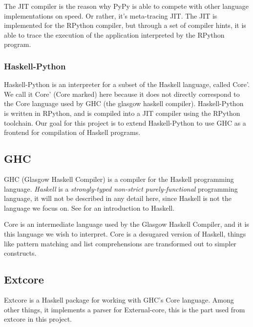 The JIT compiler is the reason why PyPy is able to compete with other language implementations
on speed. Or rather, it's meta-tracing JIT. The JIT is implemented
for the RPython compiler, but through a set of compiler hints, it is able to trace the 
execution of the application interpreted by the RPython program.

\subsubsection{Haskell-Python}

Haskell-Python is an interpreter for a subset of the Haskell language, called Core'.
We call it Core' (Core marked) here because it does not directly correspond to 
the Core language
used by GHC (the glasgow haskell compiler). Haskell-Python is written in RPython,
and is compiled into a JIT compiler using the RPython toolchain. Our goal for this
project is to extend Haskell-Python to use GHC as a frontend for compilation 
of Haskell programs.

\subsection{GHC}

GHC (Glasgow Haskell Compiler) is a compiler for the Haskell programming language.
\emph{Haskell} is a \emph{strongly-typed non-strict purely-functional} 
programming language, it will not be described in any detail here, since 
Haskell is not the language we focus on. See \cite{hudak1992report}
for an introduction to Haskell. 

Core is an intermediate language used by the Glasgow Haskell Compiler\cite{ghc},
and it is this language we wish to interpret. Core is a desugared version of Haskell, 
things like pattern matching
and list comprehensions are transformed out to simpler constructs.\cite{jones1994compilation}

\subsection{Extcore}

Extcore is a Haskell package for working with GHC's Core language. Among other things,
it implements a parser for External-core, this is the part used from extcore in this project.

